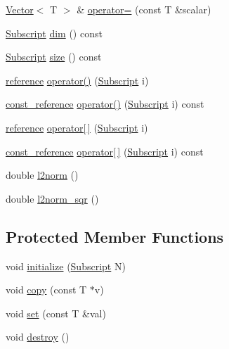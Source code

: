\begin{DoxyCompactItemize}
\item 
\hyperlink{class_vector}{Vector}$<$ T $>$ \& \hyperlink{class_vector_a2e5185fbf998e9f599641db714d7efa5}{operator=} (const T \&scalar)
\item 
\hyperlink{vec_8h_a2dedc729e88b5f13d52bc9aeeda264dc}{Subscript} \hyperlink{class_vector_a709e7cbc009b3422d4571631a7dd921b}{dim} () const 
\item 
\hyperlink{vec_8h_a2dedc729e88b5f13d52bc9aeeda264dc}{Subscript} \hyperlink{class_vector_afde82844208cffe770402780c9d6538f}{size} () const 
\item 
\hyperlink{class_vector_aacab8f5d93fda39cbdf810e3440d1c29}{reference} \hyperlink{class_vector_a6da8486f6d5f590315568dd7fe521be0}{operator()} (\hyperlink{vec_8h_a2dedc729e88b5f13d52bc9aeeda264dc}{Subscript} i)
\item 
\hyperlink{class_vector_a44d455da2c2c75f0ffda9856aa52308d}{const\+\_\+reference} \hyperlink{class_vector_aa04fb25900a745548aa2354ed0f4fda4}{operator()} (\hyperlink{vec_8h_a2dedc729e88b5f13d52bc9aeeda264dc}{Subscript} i) const 
\item 
\hyperlink{class_vector_aacab8f5d93fda39cbdf810e3440d1c29}{reference} \hyperlink{class_vector_a9e29b5bf3394ef1dcff37e239c1ad5a5}{operator\mbox{[}$\,$\mbox{]}} (\hyperlink{vec_8h_a2dedc729e88b5f13d52bc9aeeda264dc}{Subscript} i)
\item 
\hyperlink{class_vector_a44d455da2c2c75f0ffda9856aa52308d}{const\+\_\+reference} \hyperlink{class_vector_a44f63672e86aedd66fa48deee29d191e}{operator\mbox{[}$\,$\mbox{]}} (\hyperlink{vec_8h_a2dedc729e88b5f13d52bc9aeeda264dc}{Subscript} i) const 
\item 
double \hyperlink{class_vector_a7662f254a0c62df3d02e92b575f7d5ac}{l2norm} ()
\item 
double \hyperlink{class_vector_a3c8c4aa22b451c5c416fb25a627fc0b8}{l2norm\+\_\+sqr} ()
\end{DoxyCompactItemize}
\subsection*{Protected Member Functions}
\begin{DoxyCompactItemize}
\item 
void \hyperlink{class_vector_a57325431d39d428c5c14b2ccb7849f50}{initialize} (\hyperlink{vec_8h_a2dedc729e88b5f13d52bc9aeeda264dc}{Subscript} N)
\item 
void \hyperlink{class_vector_a44a9d4be6b71e4e8db60f9249cd59a4b}{copy} (const T $\ast$v)
\item 
void \hyperlink{class_vector_aa2b58b0013fb00821d8ed3b666253557}{set} (const T \&val)
\item 
void \hyperlink{class_vector_a557dae0338b7c4f08a58cae39a7df869}{destroy} ()
\end{DoxyCompactItemize}

